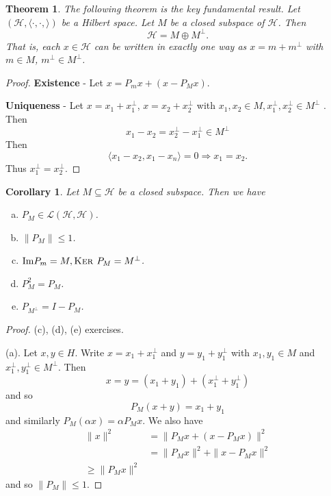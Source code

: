 \documentclass[10pt, oneside, reqno]{amsbook}
\theoremstyle{plain}%
\newtheorem{thm}{Theorem}[section]
\newtheorem*{cor}{Corollary}
\theoremstyle{definition}
\theoremstyle{remark}
\newcommand{\Hil}{\mathcal{H}}
\newcommand{\hilb}{(\Hil, \langle \cdot, \cdot, \rangle )}
\renewcommand{\ker}{\textsc{Ker\ }}
\begin{document}
\begin{thm}
    The following theorem is the key fundamental result.  
    Let $\hilb$ be a Hilbert space.  Let $M$ be a closed subspace of $\Hil$.  Then \[
         \Hil = M \oplus M^\perp.
    \]  That is, each $x \in \Hil$ can be written in exactly one way as $x = m + m^\perp$ with $m \in M$, $m^\perp \in M^\perp$. 
\end{thm}

\begin{proof}
    \textbf{Existence} - Let $x = P_m x + ( x - P_M x)$. 
    
    \textbf{Uniqueness} - Let $x = x_1 + x_1^\perp$, $x = x_2 + x_2^\perp$ with $x_1, x_2 \in M, x_1^\perp, x_2^\perp \in M^\perp$
.  Then \[
    x_1 -x_2 = x^\perp_2 - x_1^\perp \in M^\perp
\] Then \[
    \langle x_1 - x_2, x_1 - x_n \rangle = 0 \Rightarrow x_1 = x_2 .  
\] Thus $x_1^\perp = x_2^\perp$.
\end{proof} 

\begin{cor}
    Let $M \subseteq \Hil$ be a closed subspace.  Then we have
    \begin{enumerate}[(a)]
        \item $P_M \in \mathcal{L}(\Hil, \Hil)$.
        \item $\| P_M \| \leq 1$.
        \item $\text{Im}P_m = M, \ker P_M = M^\perp$.
        \item $P^2_M = P_M$.
        \item $P_{M^\perp} = I - P_M$.
    \end{enumerate} 
\end{cor}
\begin{proof}
    (c), (d), (e) exercises.  
    
    (a).  Let $x,y \in H$.  Write $x = x_1 + x^\perp_1$ and $y = y_1 + y_1^\perp$ with $x_1, y_1 \in M$ and $x_1^\perp, y_1^\perp \in M^\perp$.  Then \[
        x = y = (x_1 + y_1) + (x^\perp_1 + y^\perp_1)
    \] and so \[
        P_M(x+y) = x_1 + y_1
    \] and similarly $P_M(\alpha x) = \alpha P_M x$.  We also have 
    \begin{align*}
        \| x \|^2   &= \|P_M x + (x - P_M x) \|^2 \\
                    &= \| P_M x \|^2 + \| x - P_M x \|^2 \\
                    \geq  \| P_M x \|^2 
    \end{align*} and so $\| P_M \| \leq 1$.  
\end{proof}
\end{document}

